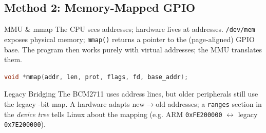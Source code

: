 \raggedcolumns
\columnbreak

\subsection{Method 2: Memory-Mapped GPIO}


\begin{concept}{MMU \& mmap}
    The CPU sees  addresses; hardware lives at 
    addresses. \texttt{/dev/mem} exposes physical memory; \texttt{mmap()} returns a
     pointer to the (page-aligned) GPIO base. The program then
    works purely with virtual addresses; the MMU translates them.
\begin{lstlisting}[language=C, style=basesmol, aboveskip=2pt, belowskip=2pt]
void *mmap(addr, len, prot, flags, fd, base_addr);
\end{lstlisting}
\end{concept}

\begin{corollary}{Legacy Bridging}
    The BCM2711 uses  address lines, but older peripherals still use
    the legacy -bit map. A hardware  adapts new$\to$old
    addresses; a \texttt{ranges} section in the \emph{device tree} tells Linux about
    the mapping (e.g. ARM \texttt{0xFE200000} $\leftrightarrow$ legacy \texttt{0x7E200000}).
\end{corollary}

